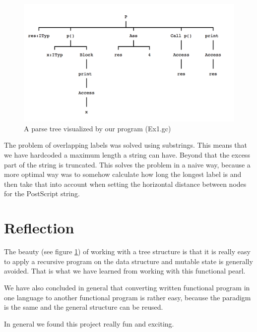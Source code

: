\documentclass[12pt]{article}
\begin{document}
\begin{figure}
\includegraphics[scale=0.75]{ex1.png}
\caption{A parse tree visualized by our program (Ex1.gc)}
\label{fig:fig2}
\end{figure}

The problem of overlapping labels was solved using substrings. This means that we have hardcoded a maximum length a string can have. Beyond that the excess part of the string is truncated. This solves the problem in a naive way, because a more optimal way was to somehow calculate how long the longest label is and then take that into account when setting the horizontal distance between nodes for the PostScript string.

\section{Reflection}
The beauty (see figure \ref{fig:fig2}) of working with a tree structure is that it is really easy to apply a recursive program on the data structure and mutable state is generally avoided. That is what we have learned from working with this functional pearl.

We have also concluded in general that converting written functional program in one language to another functional program is rather easy, because the paradigm is the same and the general structure can be reused.

In general we found this project really fun and exciting. 
\end{document}
